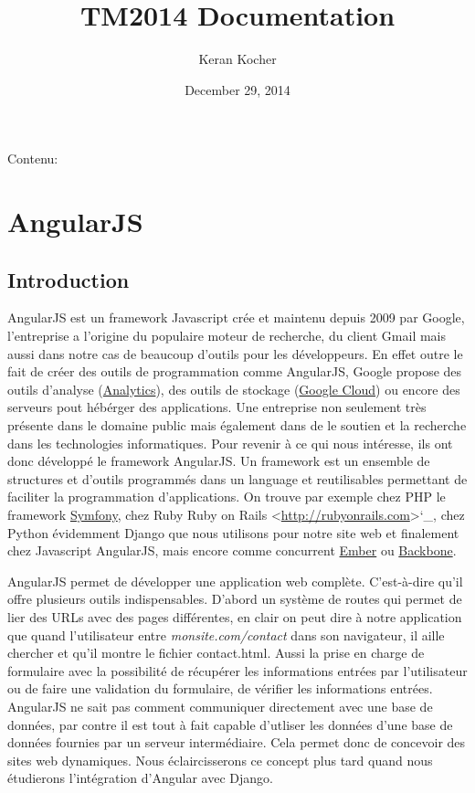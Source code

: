 \documentclass[letterpaper,10pt,english]{sphinxmanual}
\title{TM2014 Documentation}
\date{December 29, 2014}
\author{Keran Kocher}
\begin{document}
\maketitle
\tableofcontents
{}\label{index::doc}


Contenu:


\chapter{AngularJS}
\label{angularjs:developper-avec-angularjs}\label{angularjs::doc}\label{angularjs:angularjs}

\section{Introduction}
\label{angularjs:introduction}
AngularJS est un framework Javascript crée et maintenu depuis 2009 par Google, l'entreprise a l'origine du populaire moteur de recherche, du client Gmail mais aussi dans notre cas de beaucoup d'outils pour les développeurs. En effet outre le fait de créer des outils de programmation comme AngularJS, Google propose des outils d'analyse (\href{http://google.com/analytics}{Analytics}), des outils de stockage (\href{https://cloud.google.com}{Google Cloud}) ou encore des serveurs pout hébérger des applications. Une entreprise non seulement très présente dans le domaine public mais également dans de le soutien et la recherche dans les technologies informatiques. Pour revenir à ce qui nous intéresse, ils ont donc développé le framework AngularJS. Un framework est un ensemble de structures et d'outils programmés dans un language et reutilisables permettant de faciliter la programmation d'applications. On trouve par exemple chez PHP le framework \href{http://symfony.com}{Symfony}, chez Ruby Ruby on Rails \textless{}\href{http://rubyonrails.com}{http://rubyonrails.com}\textgreater{}{}`\_, chez Python évidemment Django que nous utilisons pour notre site web et finalement chez Javascript AngularJS, mais encore comme concurrent \href{http://emberjs.com}{Ember} ou \href{http://backbonejs.org}{Backbone}.

AngularJS permet de développer une application web complète. C'est-à-dire qu'il offre plusieurs outils indispensables. D'abord un système de routes qui permet de lier des URLs avec des pages différentes, en clair on peut dire à notre application que quand l'utilisateur entre \emph{monsite.com/contact} dans son navigateur, il aille chercher et qu'il montre le fichier contact.html. Aussi la prise en charge de formulaire avec la possibilité de récupérer les informations entrées par l'utilisateur ou de faire une validation du formulaire, de vérifier les informations entrées. AngularJS ne sait pas comment communiquer directement avec une base de données, par contre il est tout à fait capable d'utliser les données d'une base de données fournies par un serveur intermédiaire. Cela permet donc de concevoir des sites web dynamiques. Nous éclaircisserons ce concept plus tard quand nous étudierons l'intégration d'Angular avec Django.
\end{document}

